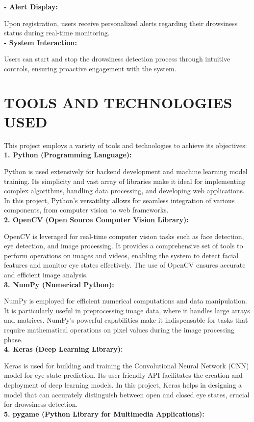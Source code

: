 \documentclass[12pt]{article}
\begin{document}
\textbf{- Alert Display:} 

Upon registration, users receive personalized alerts regarding their drowsiness status during real-time monitoring.\\

\textbf{- System Interaction:} 

Users can start and stop the drowsiness detection process through intuitive controls, ensuring proactive engagement with the system.
\newpage

\section{ TOOLS AND TECHNOLOGIES USED }

This project employs a variety of tools and technologies to achieve its objectives:\\
\textbf{1. Python (Programming Language):}

Python is used extensively for backend development and machine learning model training. Its simplicity and vast array of libraries make it ideal for implementing complex algorithms, handling data processing, and developing web applications. In this project, Python's versatility allows for seamless integration of various components, from computer vision to web frameworks.\\
\textbf{2. OpenCV (Open Source Computer Vision Library):}

OpenCV is leveraged for real-time computer vision tasks such as face detection, eye detection, and image processing. It provides a comprehensive set of tools to perform operations on images and videos, enabling the system to detect facial features and monitor eye states effectively. The use of OpenCV ensures accurate and efficient image analysis.\\
\textbf{3. NumPy (Numerical Python):}

NumPy is employed for efficient numerical computations and data manipulation. It is particularly useful in preprocessing image data, where it handles large arrays and matrices. NumPy's powerful capabilities make it indispensable for tasks that require mathematical operations on pixel values during the image processing phase.\\
\textbf{4. Keras (Deep Learning Library):}

Keras is used for building and training the Convolutional Neural Network (CNN) model for eye state prediction. Its user-friendly API facilitates the creation and deployment of deep learning models. In this project, Keras helps in designing a model that can accurately distinguish between open and closed eye states, crucial for drowsiness detection.\\
\textbf{5. pygame (Python Library for Multimedia Applications):}
\end{document}
